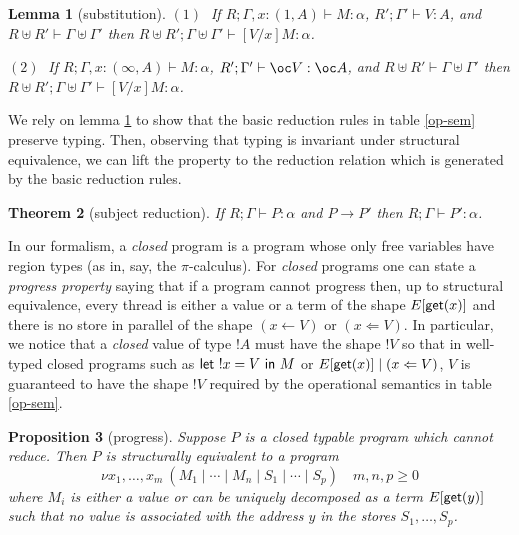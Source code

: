 \documentclass[11pt]{article}
\newcommand{\Defitem}[1]{\smallskip \noindent $#1\;$}
\newcommand{\Defitemf}[1]{\noindent $#1\;$}
\newtheorem{theorem}{Theorem}
\newtheorem{lemma}[theorem]{Lemma}
\newtheorem{proposition}[theorem]{Proposition}
\newcommand{\Gives}{\vdash}             \newcommand{\IGives}{\vdash_{I}}        \newcommand{\AIGives}{\vdash_{{\it AI}}} \newcommand{\CGives}{\vdash_{C}}
\newcommand{\arrow}{\rightarrow}        \newcommand{\trarrow}{\stackrel{*}{\rightarrow}}        \newcommand{\limp}{\multimap} \newcommand{\bang}{\oc}
\newcommand{\hyp}[3]{#1:(#2, #3)}
\newcommand{\letm}[3]{{\sf let} \ ! #1 = #2 \ {\sf in} \ #3}    \newcommand{\tertype}{{\bf 1}}
\newcommand{\csum}{\uplus}              \newcommand{\dpar}{\mid\!\mid}
\newcommand{\get}[1]{{\sf get}(#1)}
\newcommand{\store}[2]{(#1 \leftarrow #2)}
\newcommand{\pstore}[2]{(#1 \Leftarrow #2)}
\begin{document}
\begin{lemma}[substitution]\label{sub-lemma}
\Defitemf{(1)} If $R;\Gamma,\hyp{x}{1}{A} \Gives M:\alpha$,
$R';\Gamma'\Gives V: A$, and 
$R\csum R' \Gives \Gamma\csum \Gamma'$ then
$R\csum R';\Gamma\csum \Gamma'\Gives [V/x]M:\alpha$.

\Defitem{(2)} If $R;\Gamma,\hyp{x}{\infty}{A} \Gives M:\alpha$,
$R';\Gamma'\Gives \bang V:\bang A$, and 
$R\csum R' \Gives \Gamma\csum \Gamma'$ then
$R\csum R';\Gamma\csum \Gamma'\Gives [V/x]M:\alpha$.
\end{lemma}

We rely on lemma \ref{sub-lemma} to show that the basic
reduction rules in table \ref{op-sem} preserve typing.
Then, observing that typing is invariant under structural
equivalence, we can lift the property  to the reduction relation 
which is generated by the basic reduction rules.

\begin{theorem}[subject reduction]\label{sub-red-thm}
If $R;\Gamma \Gives P:\alpha$ and $P\arrow P'$ then
$R;\Gamma \Gives P':\alpha$. 
\end{theorem}


In our formalism, a {\em closed} program is a program whose only free variables
have region types (as in, say, the $\pi$-calculus). 
For {\em closed} programs one can state a {\em progress property}
saying that if a program cannot progress then, up to structural equivalence,
every thread is either a value or a term of the shape $E[\get{x}]$ and there
is no store in parallel of the shape $\store{x}{V}$ or $\pstore{x}{V}$. In particular,
we notice that a {\em closed} value of type $!A$ must have the shape $!V$ so
that in well-typed closed programs such as $\letm{x}{V}{M}$ or
$E[\get{x}]\mid \pstore{x}{V}$, $V$ is guaranteed to have the shape $!V$ 
required by the operational semantics in table \ref{op-sem}.

\begin{proposition}[progress]
Suppose $P$ is a closed typable program which cannot reduce. Then
$P$ is structurally equivalent to a program
\[
\nu x_1,\ldots,x_m \ (M_1 \mid \cdots \mid M_n \mid S_1 \mid \cdots
\mid S_p)\quad m,n,p\geq 0
\]
where $M_i$ is either a value or can be uniquely decomposed as 
a term $E[\get{y}]$ such that no value is associated with the address
$y$ in the stores $S_1,\ldots,S_p$.
\end{proposition}
\end{document}
